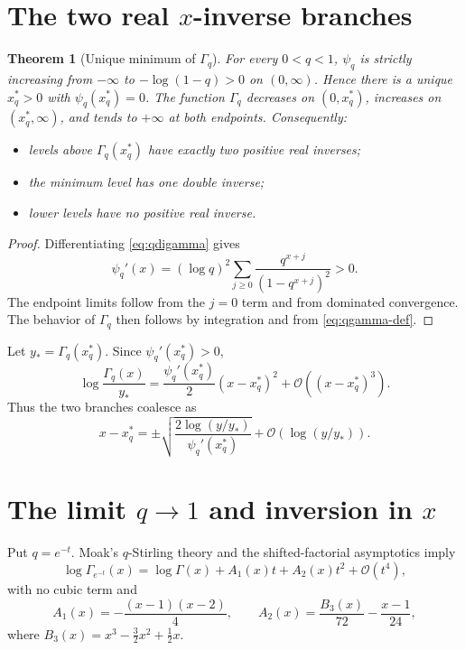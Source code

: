 \documentclass[11pt,oneside]{book}
\newtheorem{theorem}{Theorem}[chapter]
\theoremstyle{definition}
\theoremstyle{remark}
\newcommand{\OO}{\mathcal{O}}
\begin{document}
\section{The two real $x$-inverse branches}
\begin{theorem}[Unique minimum of $\Gamma_q$]\label{thm:qgamma-minimum}
For every $0<q<1$, $\psi_q$ is strictly increasing from $-\infty$ to
$-\log(1-q)>0$ on $(0,\infty)$.  Hence there is a unique $x_q^*>0$ with
$\psi_q(x_q^*)=0$.  The function $\Gamma_q$ decreases on $(0,x_q^*)$,
increases on $(x_q^*,\infty)$, and tends to $+\infty$ at both endpoints.
Consequently:
\begin{itemize}
\item levels above $\Gamma_q(x_q^*)$ have exactly two positive real inverses;
\item the minimum level has one double inverse;
\item lower levels have no positive real inverse.
\end{itemize}
\end{theorem}
\begin{proof}
Differentiating \eqref{eq:qdigamma} gives
\[
 \psi_q'(x)=(\log q)^2
 \sum_{j\ge0}\frac{q^{x+j}}{(1-q^{x+j})^2}>0.
\]
The endpoint limits follow from the $j=0$ term and from dominated convergence.
The behavior of $\Gamma_q$ then follows by integration and from
\eqref{eq:qgamma-def}.
\end{proof}

Let $y_*=\Gamma_q(x_q^*)$.  Since $\psi_q'(x_q^*)>0$,
\[
 \log\frac{\Gamma_q(x)}{y_*}
 =\frac{\psi_q'(x_q^*)}{2}(x-x_q^*)^2+\OO((x-x_q^*)^3).
\]
Thus the two branches coalesce as
\begin{equation}\label{eq:qgamma-min-inverse}
 x-x_q^*=\pm
 \sqrt{\frac{2\log(y/y_*)}{\psi_q'(x_q^*)}}
 +\OO(\log(y/y_*)).
\end{equation}

\section{The limit $q\to1$ and inversion in $x$}
Put $q=e^{-t}$.  Moak's $q$-Stirling theory and the shifted-factorial
asymptotics imply \cite{Moak1984,McIntosh1999}
\begin{equation}\label{eq:qgamma-qone-expansion}
 \log\Gamma_{e^{-t}}(x)
 =\log\Gamma(x)+A_1(x)t+A_2(x)t^2+\OO(t^4),
\end{equation}
with no cubic term and
\begin{equation}\label{eq:qgamma-A12}
 A_1(x)=-\frac{(x-1)(x-2)}4,
 \qquad
 A_2(x)=\frac{B_3(x)}{72}-\frac{x-1}{24},
\end{equation}
where $B_3(x)=x^3-\tfrac32x^2+\tfrac12x$.
\end{document}
